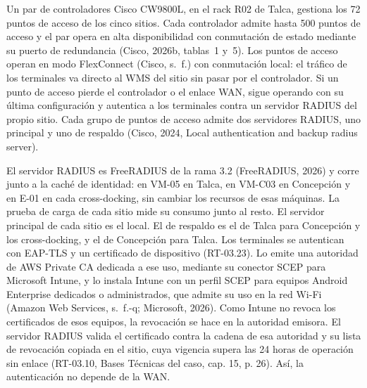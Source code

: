 Un par de controladores Cisco CW9800L, en el rack R02 de Talca, gestiona los 72 puntos de acceso de los cinco sitios. Cada controlador admite hasta 500 puntos de acceso y el par opera en alta disponibilidad con conmutación de estado mediante su puerto de redundancia (Cisco, 2026b, tablas~1 y~5). Los puntos de acceso operan en modo FlexConnect (Cisco, s.~f.) con conmutación local: el tráfico de los terminales va directo al WMS del sitio sin pasar por el controlador. Si un punto de acceso pierde el controlador o el enlace WAN, sigue operando con su última configuración y autentica a los terminales contra un servidor RADIUS del propio sitio. Cada grupo de puntos de acceso admite dos servidores RADIUS, uno principal y uno de respaldo (Cisco, 2024, Local authentication and backup radius server).

El servidor RADIUS es FreeRADIUS de la rama 3.2 (FreeRADIUS, 2026) y corre junto a la caché de identidad: en VM-05 en Talca, en VM-C03 en Concepción y en E-01 en cada cross-docking, sin cambiar los recursos de esas máquinas. La prueba de carga de cada sitio mide su consumo junto al resto. El servidor principal de cada sitio es el local. El de respaldo es el de Talca para Concepción y los cross-docking, y el de Concepción para Talca. Los terminales se autentican con EAP-TLS y un certificado de dispositivo (RT-03.23). Lo emite una autoridad de AWS Private CA dedicada a ese uso, mediante su conector SCEP para Microsoft Intune, y lo instala Intune con un perfil SCEP para equipos Android Enterprise dedicados o administrados, que admite su uso en la red Wi-Fi (Amazon Web Services, s.~f.-q; Microsoft, 2026). Como Intune no revoca los certificados de esos equipos, la revocación se hace en la autoridad emisora. El servidor RADIUS valida el certificado contra la cadena de esa autoridad y su lista de revocación copiada en el sitio, cuya vigencia supera las 24 horas de operación sin enlace (RT-03.10, Bases Técnicas del caso, cap. 15, p. 26). Así, la autenticación no depende de la WAN.

